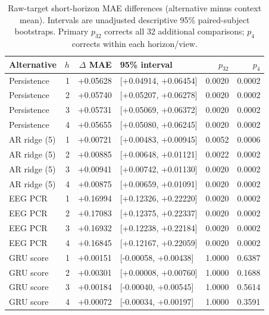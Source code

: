 \begin{table}[!ht]
\centering
\small
\setlength{\tabcolsep}{5pt}
\renewcommand{\arraystretch}{1.1}
\caption{Raw-target short-horizon MAE differences (alternative minus context mean). Intervals are unadjusted descriptive 95\% paired-subject bootstraps. Primary $p_{32}$ corrects all 32 additional comparisons; $p_4$ corrects within each horizon/view.}
\label{tab:supp_short_pairs_raw}
\begin{tabular}{lrrlrr}
\toprule
Alternative & $h$ & $\Delta$ MAE & 95\% interval & $p_{32}$ & $p_4$ \\
\midrule
Persistence & 1 & +0.05628 & [+0.04914, +0.06454] & 0.0020 & 0.0002 \\
Persistence & 2 & +0.05740 & [+0.05207, +0.06278] & 0.0020 & 0.0002 \\
Persistence & 3 & +0.05731 & [+0.05069, +0.06372] & 0.0020 & 0.0002 \\
Persistence & 4 & +0.05655 & [+0.05080, +0.06245] & 0.0020 & 0.0002 \\
AR ridge (5) & 1 & +0.00721 & [+0.00483, +0.00945] & 0.0052 & 0.0006 \\
AR ridge (5) & 2 & +0.00885 & [+0.00648, +0.01121] & 0.0022 & 0.0002 \\
AR ridge (5) & 3 & +0.00941 & [+0.00742, +0.01130] & 0.0020 & 0.0002 \\
AR ridge (5) & 4 & +0.00875 & [+0.00659, +0.01091] & 0.0020 & 0.0002 \\
EEG PCR & 1 & +0.16994 & [+0.12326, +0.22220] & 0.0020 & 0.0002 \\
EEG PCR & 2 & +0.17083 & [+0.12375, +0.22337] & 0.0020 & 0.0002 \\
EEG PCR & 3 & +0.16932 & [+0.12238, +0.22184] & 0.0020 & 0.0002 \\
EEG PCR & 4 & +0.16845 & [+0.12167, +0.22059] & 0.0020 & 0.0002 \\
GRU score & 1 & +0.00151 & [-0.00058, +0.00438] & 1.0000 & 0.6387 \\
GRU score & 2 & +0.00301 & [+0.00008, +0.00760] & 1.0000 & 0.1688 \\
GRU score & 3 & +0.00184 & [-0.00040, +0.00545] & 1.0000 & 0.5614 \\
GRU score & 4 & +0.00072 & [-0.00034, +0.00197] & 1.0000 & 0.3591 \\
\bottomrule
\end{tabular}
\end{table}
